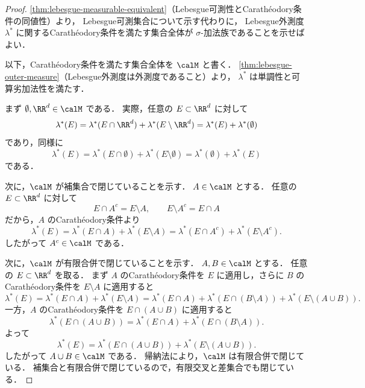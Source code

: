 \begin{proof}
\cref{thm:lebesgue-measurable-equivalent}（Lebesgue可測性とCarathéodory条件の同値性）より，
Lebesgue可測集合について示す代わりに，
Lebesgue外測度 $\lambda^*$ に関するCarathéodory条件を満たす集合全体が
$\sigma$-加法族であることを示せばよい．

以下，Carathéodory条件を満たす集合全体を $\calM$ と書く．
\cref{thm:lebesgue-outer-measure}（Lebesgue外測度は外測度であること）より，
$\lambda^*$ は単調性と可算劣加法性を満たす．

まず $\emptyset,\RR^d\in\calM$ である．
実際，任意の $E\subset\RR^d$ に対して
\[
\lambda^*(E)
=
\lambda^*(E\cap\RR^d)+\lambda^*(E\setminus\RR^d)
=
\lambda^*(E)+\lambda^*(\emptyset)
\]
であり，同様に
\[
\lambda^*(E)
=
\lambda^*(E\cap\emptyset)+\lambda^*(E\setminus\emptyset)
=
\lambda^*(\emptyset)+\lambda^*(E)
\]
である．

次に，$\calM$ が補集合で閉じていることを示す．
$A\in\calM$ とする．
任意の $E\subset\RR^d$ に対して
\[
E\cap A^c=E\setminus A,
\qquad
E\setminus A^c=E\cap A
\]
だから，$A$ のCarathéodory条件より
\[
\lambda^*(E)
=
\lambda^*(E\cap A)+\lambda^*(E\setminus A)
=
\lambda^*(E\cap A^c)+\lambda^*(E\setminus A^c).
\]
したがって $A^c\in\calM$ である．

次に，$\calM$ が有限合併で閉じていることを示す．
$A,B\in\calM$ とする．
任意の $E\subset\RR^d$ を取る．
まず $A$ のCarathéodory条件を $E$ に適用し，さらに
$B$ のCarathéodory条件を $E\setminus A$ に適用すると
\[
\lambda^*(E)
=
\lambda^*(E\cap A)+\lambda^*(E\setminus A)
=
\lambda^*(E\cap A)+\lambda^*(E\cap(B\setminus A))
  +\lambda^*(E\setminus(A\cup B)).
\]
一方，$A$ のCarathéodory条件を $E\cap(A\cup B)$ に適用すると
\[
\lambda^*(E\cap(A\cup B))
=
\lambda^*(E\cap A)+\lambda^*(E\cap(B\setminus A)).
\]
よって
\[
\lambda^*(E)
=
\lambda^*(E\cap(A\cup B))+\lambda^*(E\setminus(A\cup B)).
\]
したがって $A\cup B\in\calM$ である．
帰納法により，$\calM$ は有限合併で閉じている．
補集合と有限合併で閉じているので，有限交叉と差集合でも閉じている．


\end{proof}
